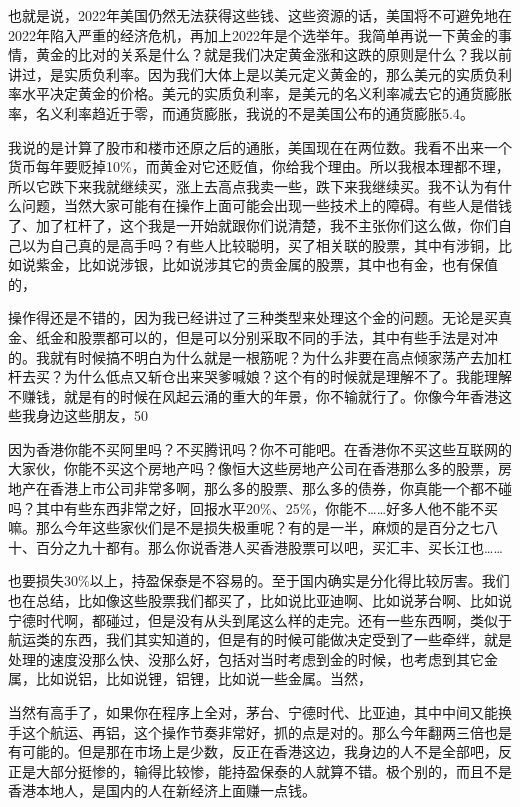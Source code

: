 \documentclass[UTF8, 12pt, a4paper]{ctexrep}
\begin{document}
也就是说，2022年美国仍然无法获得这些钱、这些资源的话，美国将不可避免地在2022年陷入严重的经济危机，再加上2022年是个选举年。我简单再说一下黄金的事情，黄金的比对的关系是什么？就是我们决定黄金涨和这跌的原则是什么？我以前讲过，是实质负利率。因为我们大体上是以美元定义黄金的，那么美元的实质负利率水平决定黄金的价格。美元的实质负利率，是美元的名义利率减去它的通货膨胀率，名义利率趋近于零，而通货膨胀，我说的不是美国公布的通货膨胀5.4。

我说的是计算了股市和楼市还原之后的通胀，美国现在在两位数。我看不出来一个货币每年要贬掉10\%，而黄金对它还贬值，你给我个理由。所以我根本理都不理，所以它跌下来我就继续买，涨上去高点我卖一些，跌下来我继续买。我不认为有什么问题，当然大家可能有在操作上面可能会出现一些技术上的障碍。有些人是借钱了、加了杠杆了，这个我是一开始就跟你们说清楚，我不主张你们这么做，你们自己以为自己真的是高手吗？有些人比较聪明，买了相关联的股票，其中有涉铜，比如说紫金，比如说涉银，比如说涉其它的贵金属的股票，其中也有金，也有保值的，

操作得还是不错的，因为我已经讲过了三种类型来处理这个金的问题。无论是买真金、纸金和股票都可以的，但是可以分别采取不同的手法，其中有些手法是对冲的。我就有时候搞不明白为什么就是一根筋呢？为什么非要在高点倾家荡产去加杠杆去买？为什么低点又斩仓出来哭爹喊娘？这个有的时候就是理解不了。我能理解不赚钱，就是有的时候在风起云涌的重大的年景，你不输就行了。你像今年香港这些我身边这些朋友，50%

因为香港你能不买阿里吗？不买腾讯吗？你不可能吧。在香港你不买这些互联网的大家伙，你能不买这个房地产吗？像恒大这些房地产公司在香港那么多的股票，房地产在香港上市公司非常多啊，那么多的股票、那么多的债券，你真能一个都不碰吗？其中有些东西非常之好，回报水平20\%、25\%，你能不……好多人他不能不买嘛。那么今年这些家伙们是不是损失极重呢？有的是一半，麻烦的是百分之七八十、百分之九十都有。那么你说香港人买香港股票可以吧，买汇丰、买长江也……

也要损失30\%以上，持盈保泰是不容易的。至于国内确实是分化得比较厉害。我们也在总结，比如像这些股票我们都买了，比如说比亚迪啊、比如说茅台啊、比如说宁德时代啊，都碰过，但是没有从头到尾这么样的走完。还有一些东西啊，类似于航运类的东西，我们其实知道的，但是有的时候可能做决定受到了一些牵绊，就是处理的速度没那么快、没那么好，包括对当时考虑到金的时候，也考虑到其它金属，比如说铝，比如说锂，铝锂，比如说一些金属。当然，

当然有高手了，如果你在程序上全对，茅台、宁德时代、比亚迪，其中中间又能换手这个航运、再铝，这个操作节奏非常好，抓的点是对的。那么今年翻两三倍也是有可能的。但是那在市场上是少数，反正在香港这边，我身边的人不是全部吧，反正是大部分挺惨的，输得比较惨，能持盈保泰的人就算不错。极个别的，而且不是香港本地人，是国内的人在新经济上面赚一点钱。
\end{document}
